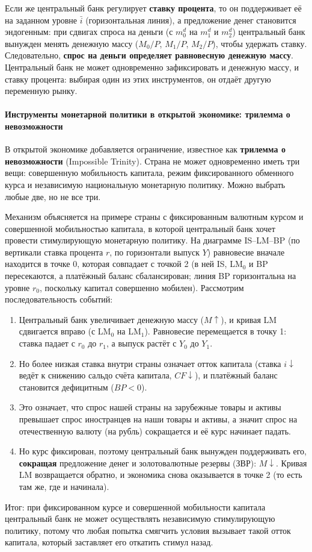 \documentclass[11pt,a4paper]{article}
\begin{document}
Если же центральный банк регулирует \textbf{ставку процента}, то он поддерживает её на заданном уровне $\bar i$ (горизонтальная линия), а предложение денег становится эндогенным: при сдвигах спроса на деньги (с $m_0^d$ на $m_1^d$ и $m_2^d$) центральный банк вынужден менять денежную массу ($M_0/P$, $M_1/P$, $M_2/P$), чтобы удержать ставку. Следовательно, \textbf{спрос на деньги определяет равновесную денежную массу}. Центральный банк не может одновременно зафиксировать и денежную массу, и ставку процента: выбирая один из этих инструментов, он отдаёт другую переменную рынку.

\paragraph{Инструменты монетарной политики в открытой экономике: трилемма о невозможности}

В открытой экономике добавляется ограничение, известное как \textbf{трилемма о невозможности} (Impossible Trinity). Страна не может одновременно иметь три вещи: совершенную мобильность капитала, режим фиксированного обменного курса и независимую национальную монетарную политику. Можно выбрать любые две, но не все три.

Механизм объясняется на примере страны с фиксированным валютным курсом и совершенной мобильностью капитала, в которой центральный банк хочет провести стимулирующую монетарную политику. На диаграмме IS--LM--BP (по вертикали ставка процента $r$, по горизонтали выпуск $Y$) равновесие вначале находится в точке 0, которая совпадает с точкой 2 (в ней IS, LM$_0$ и BP пересекаются, а платёжный баланс сбалансирован; линия BP горизонтальна на уровне $r_0$, поскольку капитал совершенно мобилен). Рассмотрим последовательность событий:
\begin{enumerate}[leftmargin=1.6em]
\item Центральный банк увеличивает денежную массу ($M\uparrow$), и кривая LM сдвигается вправо (с LM$_0$ на LM$_1$). Равновесие перемещается в точку 1: ставка падает с $r_0$ до $r_1$, а выпуск растёт с $Y_0$ до $Y_1$.
\item Но более низкая ставка внутри страны означает отток капитала (ставка $i\downarrow$ ведёт к снижению сальдо счёта капитала, $CF\downarrow$), и платёжный баланс становится дефицитным ($BP<0$).
\item Это означает, что спрос нашей страны на зарубежные товары и активы превышает спрос иностранцев на наши товары и активы, а значит спрос на отечественную валюту (на рубль) сокращается и её курс начинает падать.
\item Но курс фиксирован, поэтому центральный банк вынужден поддерживать его, \textbf{сокращая} предложение денег и золотовалютные резервы (ЗВР): $M\downarrow$. Кривая LM возвращается обратно, и экономика снова оказывается в точке 2 (то есть там же, где и начинала).
\end{enumerate}
Итог: при фиксированном курсе и совершенной мобильности капитала центральный банк не может осуществлять независимую стимулирующую политику, потому что любая попытка смягчить условия вызывает такой отток капитала, который заставляет его откатить стимул назад.
\end{document}
